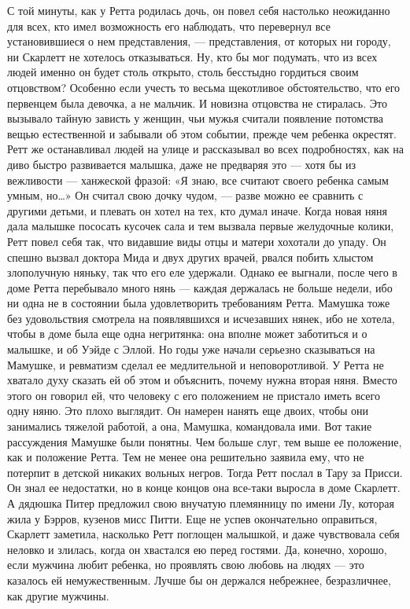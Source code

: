 С той минуты, как у Ретта родилась дочь, он повел себя настолько неожиданно для всех, кто имел возможность его наблюдать, что перевернул все установившиеся о нем представления, — представления, от которых ни городу, ни Скарлетт не хотелось отказываться. Ну, кто бы мог подумать, что из всех людей именно он будет столь открыто, столь бесстыдно гордиться своим отцовством? Особенно если учесть то весьма щекотливое обстоятельство, что его первенцем была девочка, а не мальчик.
И новизна отцовства не стиралась. Это вызывало тайную зависть у женщин, чьи мужья считали появление потомства вещью естественной и забывали об этом событии, прежде чем ребенка окрестят. Ретт же останавливал людей на улице и рассказывал во всех подробностях, как на диво быстро развивается малышка, даже не предваряя это — хотя бы из вежливости — ханжеской фразой: «Я знаю, все считают своего ребенка самым умным, но…» Он считал свою дочку чудом, — разве можно ее сравнить с другими детьми, и плевать он хотел на тех, кто думал иначе. Когда новая няня дала малышке пососать кусочек сала и тем вызвала первые желудочные колики, Ретт повел себя так, что видавшие виды отцы и матери хохотали до упаду. Он спешно вызвал доктора Мида и двух других врачей, рвался побить хлыстом злополучную няньку, так что его еле удержали. Однако ее выгнали, после чего в доме Ретта перебывало много нянь — каждая держалась не больше недели, ибо ни одна не в состоянии была удовлетворить требованиям Ретта.
Мамушка тоже без удовольствия смотрела на появлявшихся и исчезавших нянек, ибо не хотела, чтобы в доме была еще одна негритянка: она вполне может заботиться и о малышке, и об Уэйде с Эллой. Но годы уже начали серьезно сказываться на Мамушке, и ревматизм сделал ее медлительной и неповоротливой. У Ретта не хватало духу сказать ей об этом и объяснить, почему нужна вторая няня. Вместо этого он говорил ей, что человеку с его положением не пристало иметь всего одну няню. Это плохо выглядит. Он намерен нанять еще двоих, чтобы они занимались тяжелой работой, а она, Мамушка, командовала ими. Вот такие рассуждения Мамушке были понятны. Чем больше слуг, тем выше ее положение, как и положение Ретта. Тем не менее она решительно заявила ему, что не потерпит в детской никаких вольных негров. Тогда Ретт послал в Тару за Присси. Он знал ее недостатки, но в конце концов она все-таки выросла в доме Скарлетт. А дядюшка Питер предложил свою внучатую племянницу по имени Лу, которая жила у Бэрров, кузенов мисс Питти.
Еще не успев окончательно оправиться, Скарлетт заметила, насколько Ретт поглощен малышкой, и даже чувствовала себя неловко и злилась, когда он хвастался ею перед гостями. Да, конечно, хорошо, если мужчина любит ребенка, но проявлять свою любовь на людях — это казалось ей немужественным. Лучше бы он держался небрежнее, безразличнее, как другие мужчины.
